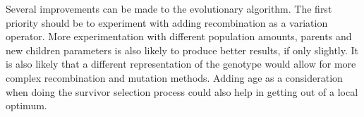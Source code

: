 Several improvements can be made to the evolutionary algorithm. The first priority should be to experiment with adding recombination as a variation operator. More experimentation with different population amounts, parents and new children parameters is also likely to produce better results, if only slightly. It is also likely that a different representation of the genotype would allow for more complex recombination and mutation methods. Adding age as a consideration when doing the survivor selection process could also help in getting out of a local optimum.